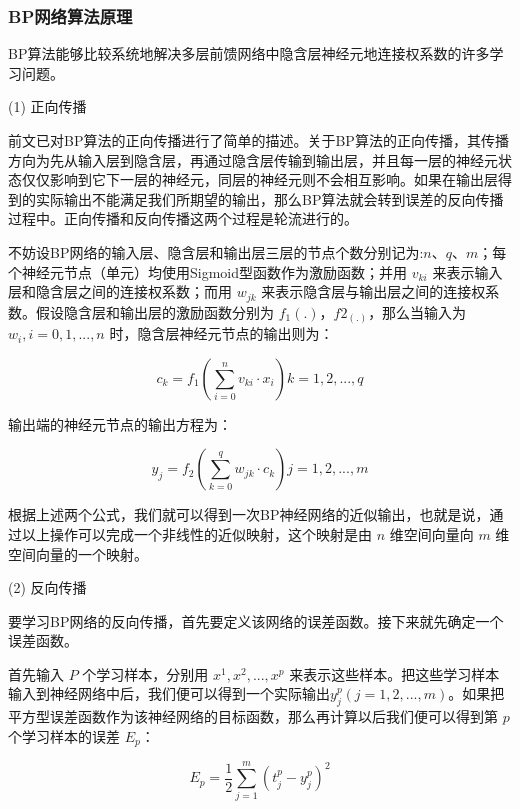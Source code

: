 \documentclass[UTF8]{ctexart}
\begin{document}
\subsubsection{BP网络算法原理}

BP算法能够比较系统地解决多层前馈网络中隐含层神经元地连接权系数的许多学习问题。 \par

(1) 正向传播 \par

前文已对BP算法的正向传播进行了简单的描述。关于BP算法的正向传播，其传播方向为先从输入层到隐含层，再通过隐含层传输到输出层，并且每一层的神经元状态仅仅影响到它下一层的神经元，同层的神经元则不会相互影响。如果在输出层得到的实际输出不能满足我们所期望的输出，那么BP算法就会转到误差的反向传播过程中。正向传播和反向传播这两个过程是轮流进行的。 \par

不妨设BP网络的输入层、隐含层和输出层三层的节点个数分别记为:$n$、$q$、$m$；每个神经元节点（单元）均使用Sigmoid型函数作为激励函数；并用 $v_{ki}$ 来表示输入层和隐含层之间的连接权系数；而用 $w_{jk}$ 来表示隐含层与输出层之间的连接权系数。假设隐含层和输出层的激励函数分别为 $f_1(.)$，$f2_(.)$，那么当输入为 $w_i,i=0,1,...,n$ 时，隐含层神经元节点的输出则为：

\begin{equation} 
c_k = f_1(\sum_{i=0}^{n} v_{ki} \cdot x_i) k = 1,2,...,q
\end{equation}

输出端的神经元节点的输出方程为：

\begin{equation} 
y_j = f_2(\sum_{k=0}^{q} w_{jk} \cdot c_k) j = 1,2,...,m
\end{equation}

根据上述两个公式，我们就可以得到一次BP神经网络的近似输出，也就是说，通过以上操作可以完成一个非线性的近似映射，这个映射是由 $n$ 维空间向量向 $m$ 维空间向量的一个映射。

(2) 反向传播 \par

要学习BP网络的反向传播，首先要定义该网络的误差函数。接下来就先确定一个误差函数。 \par

首先输入 $P$ 个学习样本，分别用 $x^1,x^2,...,x^p$ 来表示这些样本。把这些学习样本输入到神经网络中后，我们便可以得到一个实际输出$y_j^p(j=1,2,...,m)$。如果把平方型误差函数作为该神经网络的目标函数，那么再计算以后我们便可以得到第 $p$ 个学习样本的误差 $E_p$：

\begin{equation} 
E_p=\frac{1}{2} \sum_{j=1}^{m}  (t_{j}^{p} - y_{j}^{p})^2
\end{equation}
\end{document}
